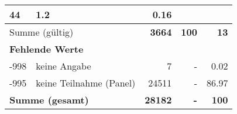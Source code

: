 \begin{longtable}{lXrrr}
       \num{44} &
       \num[round-mode=places,round-precision=2]{1.2} &
         \num[round-mode=places,round-precision=2]{0.16} \\
     \midrule
     \multicolumn{2}{l}{Summe (gültig)} &
       \textbf{\num{3664}} &
     \textbf{100} &
       \textbf{\num[round-mode=places,round-precision=2]{13}} \\
     \multicolumn{5}{l}{\textbf{Fehlende Werte}}\\
       -998 &
       keine Angabe &
         \num{7} &
        - &
         \num[round-mode=places,round-precision=2]{0.02} \\
       -995 &
       keine Teilnahme (Panel) &
         \num{24511} &
        - &
         \num[round-mode=places,round-precision=2]{86.97} \\
     \midrule
     \multicolumn{2}{l}{\textbf{Summe (gesamt)}} &
          \textbf{\num{28182}} &
        \textbf{-} &
        \textbf{100} \\
     \bottomrule
     \end{longtable}
     
